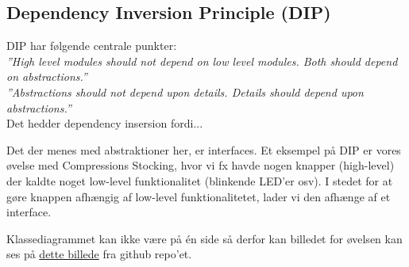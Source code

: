 \subsection{Dependency Inversion Principle (DIP)}
DIP har følgende centrale punkter:\\

\textit{''High level modules should not depend on low level modules. Both should depend on abstractions.''}\\

\textit{''Abstractions should not depend upon details. Details should depend upon abstractions.''}\\

Det hedder dependency insersion fordi...

Det der menes med abstraktioner her, er interfaces. Et eksempel på DIP er vores øvelse med Compressions Stocking, hvor vi fx havde nogen knapper (high-level) der kaldte noget low-level funktionalitet (blinkende LED’er osv). I stedet for at gøre knappen afhængig af low-level funktionalitetet, lader vi den afhænge af et interface. 

Klassediagrammet kan ikke være på én side så derfor kan billedet for øvelsen kan ses på  \href{https://raw.githubusercontent.com/BjornNorgaard/I4SWD/bdd4a11a87f182d81b3ed81409a2052e45be82c3/Eksamen/Disposition/figs/compressionstockings_classdiagram.PNG}{dette billede} fra github repo'et.